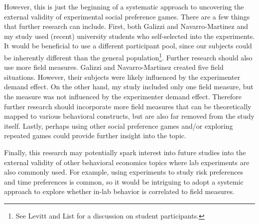\documentclass[12pt]{article}
\begin{document}
However, this is just the beginning of a systematic approach to uncovering the external validity of experimental social preference games. There are a few things that further research can include. First, both Galizzi and Navarro-Martinez and my study used (recent) university students who self-selected into the experiments. It would be beneficial to use a different participant pool, since our subjects could be inherently different than the general population\footnote{See Levitt and List for a discussion on student participants.}. Further research should also use more field measures. Galizzi and Navarro-Martinez created five field situations. However, their subjects were likely influenced by the experimenter demand effect. On the other hand, my study included only one field measure, but the measure was not influenced by the experimenter demand effect. Therefore further research should incorporate more field measures that can be theoretically mapped to various behavioral constructs, but are also far removed from the study itself. Lastly, perhaps using other social preference games and/or exploring repeated games could provide further insight into the topic.

Finally, this research may potentially spark interest into future studies into the external validity of other behavioral economics topics where lab experiments are also commonly used. For example, using experiments to study risk preferences and time preferences is common, so it would be intriguing to adopt a systemic approach to explore whether in-lab behavior is correlated to field measures.



\newpage




%
\end{document}

